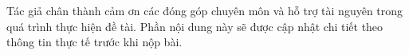 Tác giả chân thành cảm ơn các đóng góp chuyên môn và hỗ trợ tài nguyên trong quá trình thực hiện đề tài. Phần nội dung này sẽ được cập nhật chi tiết theo thông tin thực tế trước khi nộp bài.